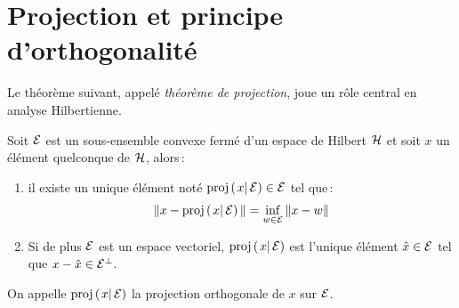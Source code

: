 \section{Projection et principe d'orthogonalit\'{e}}
Le th\'{e}or\`{e}me suivant, appel\'{e} \emph{th\'{e}or\`{e}me de projection},
joue un r\^{o}le central en analyse Hilbertienne.
\begin{theorem} \label{theo:projection}
Soit $\cal E$ est un sous-ensemble convexe ferm\'{e} d'un espace de Hilbert
$\cal H$ et soit $x$ un \'{e}l\'{e}ment quelconque de ${\cal H}$, alors\,:
\begin{enumerate}[label=\emph{\alph*})]
   \item
   il existe un unique \'{e}l\'{e}ment not\'{e} $\proj{x}{\cE}\in {\cal E}$ tel que\,:
\begin{eqnarray*}
 \|x-\proj{x}{\cE}\| = \inf_{w \in \cE} \| x - w \|
\end{eqnarray*}
   \item
   \label{it:ppceortho}
   Si de plus $\cal E$ est un espace vectoriel, $\proj{x}{\cE}$ est
   l'unique \'{e}l\'{e}ment $\hat x\in\mathcal{E}$ tel que $x-\hat x\in \mathcal{E}^\perp$.
\end{enumerate}
On appelle $\proj{x}{\cE}$ la projection orthogonale de $x$ sur $\mathcal{E}$.
\end{theorem}
